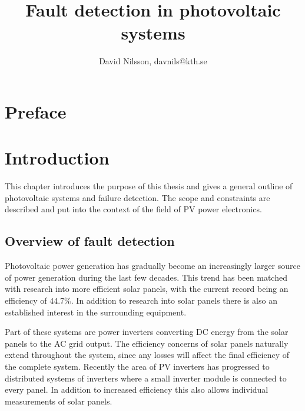 


\title{Fault detection in photovoltaic systems}
\author{David Nilsson, davnils@kth.se}



\maketitle


\tableofcontents

\chapter*{Preface}
\lipsum[1]

\printglossaries
\cleardoublepage
{}
\listoffigures
\clearpage
{}

\chapter{Introduction}
This chapter introduces the purpose of this thesis and gives a general outline of photovoltaic systems and failure detection.
The scope and constraints are described and put into the context of the field of PV power electronics.

\section{Overview of fault detection}
Photovoltaic power generation has gradually become an increasingly larger source of power generation during the last few decades\cite{Zhao2010thesis}.
This trend has been matched with research into more efficient solar panels, with the current record being an efficiency of $44.7\%$\cite{Fraunhofer2013}.
In addition to research into solar panels there is also an established interest in the surrounding equipment.

Part of these systems are power inverters converting DC energy from the solar panels to the AC grid output.
The efficiency concerns of solar panels naturally extend throughout the system, since any losses will affect the final efficiency of the complete system.
Recently the area of PV inverters has progressed to distributed systems of inverters where a small inverter module is connected to every panel\cite{Roman2006}.
In addition to increased efficiency this also allows individual measurements of solar panels.

